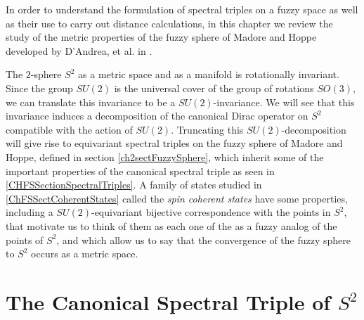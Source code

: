 In order to understand the formulation of spectral triples on a fuzzy space as well as their use to carry out distance calculations, in this chapter we review the study of the metric properties of the fuzzy sphere of Madore and Hoppe \cite{Madore} developed by D'Andrea, et al. in \cite{DAndrea2013}. 

The $2$-sphere $S^2$ as a metric space and as a manifold is rotationally invariant. Since the group $SU(2)$ is the universal cover of the group of rotations $SO(3)$, we can translate this invariance to be a $SU(2)$-invariance. We will see that this invariance induces a decomposition of the canonical Dirac operator on $S^2$ compatible with the action of $SU(2)$. Truncating this $SU(2)$-decomposition will give rise to equivariant spectral triples on the fuzzy sphere of Madore and Hoppe, defined in section \ref{ch2sectFuzzySphere}, which inherit some of the important properties of the canonical spectral triple as seen in \ref{CHFSSectionSpectralTriples}. A family of states studied in \ref{ChFSSectCoherentStates} called the \textit{spin coherent states} have some properties, including a $SU(2)$-equivariant bijective correspondence with the points in $S^2$, that motivate us to think of them as each one of the as a fuzzy analog of the points of $S^2$, and which allow us to say that the convergence of the fuzzy sphere to $S^2$ occurs as a metric space.


\section{The Canonical Spectral Triple of $S^2$}





    
    
